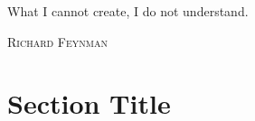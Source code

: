 \epigraph{What I cannot create, I do not understand.}%
{\textsc{Richard Feynman}}
\null\vfill
\newpage
\blankpagewithnumber
\section{Section Title}
\lipsum[1]
\newpage
\blankpagewithnumber